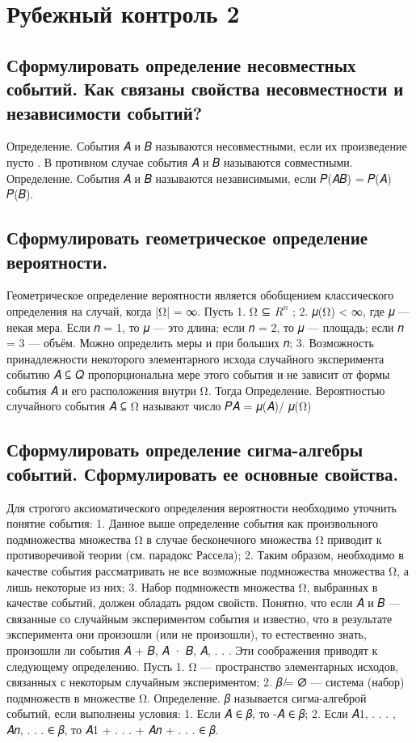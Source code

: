 \section{Рубежный контроль 2}

\subsection{Сформулировать определение несовместных событий. Как связаны свойства несовместности и независимости событий?}

Определение. События 𝐴 и 𝐵 называются несовместными, если их произведение пусто . В противном случае события 𝐴 и 𝐵 называются совместными.
Определение. События 𝐴 и 𝐵 называются независимыми, если 𝑃(𝐴𝐵) = 𝑃(𝐴) 𝑃(𝐵).

\subsection{Сформулировать геометрическое определение вероятности.}

Геометрическое определение вероятности является обобщением классического определения на случай, когда |Ω| = ∞. 
Пусть 
1. Ω ⊆ $R^𝑛$ ;
2. 𝜇(Ω) < ∞, где 𝜇 — некая мера. Если 𝑛 = 1, то 𝜇 — это длина; если 𝑛 = 2, то 𝜇 — площадь; если 𝑛 = 3 — объём. Можно определить меры и при больших 𝑛; 
3. Возможность принадлежности некоторого элементарного исхода случайного эксперимента событию 𝐴 ⊆ 𝑄 пропорциональна мере этого события и не зависит от формы события 𝐴 и его расположения внутри Ω. 
Тогда 
Определение. Вероятностью случайного события 𝐴 ⊆ Ω называют число 𝑃{𝐴} = 𝜇(𝐴)/ 𝜇(Ω)

\subsection{Сформулировать определение сигма-алгебры событий. Сформулировать ее основные свойства.}

Для строгого аксиоматического определения вероятности необходимо уточнить понятие события:
1. Данное выше определение события как произвольного подмножества множества Ω в случае бесконечного множества Ω приводит к противоречивой теории (см. парадокс Рассела); 
2. Таким образом, необходимо в качестве события рассматривать не все возможные подмножества множества Ω, а лишь некоторые из них; 
3. Набор подмножеств множества Ω, выбранных в качестве событий, должен обладать рядом свойств. Понятно, что если 𝐴 и 𝐵 — связанные со случайным экспериментом события и известно, что в результате эксперимента они произошли (или не произошли), то естественно знать, произошли ли события 𝐴 + 𝐵, 𝐴 · 𝐵, 𝐴,  . . .
Эти соображения приводят к следующему определению.
Пусть 
1. Ω — пространство элементарных исходов, связанных с некоторым случайным экспериментом; 
2. 𝛽 ̸= ∅ — система (набор) подмножеств в множестве Ω.
Определение. 
𝛽 называется сигма-алгеброй событий, если выполнены условия: 
1. Если 𝐴 ∈ 𝛽, то -𝐴 ∈ 𝛽;
2. Если 𝐴1, . . . , 𝐴𝑛, . . . ∈ 𝛽, то 𝐴1 + . . . + 𝐴𝑛 + . . . ∈ 𝛽.


